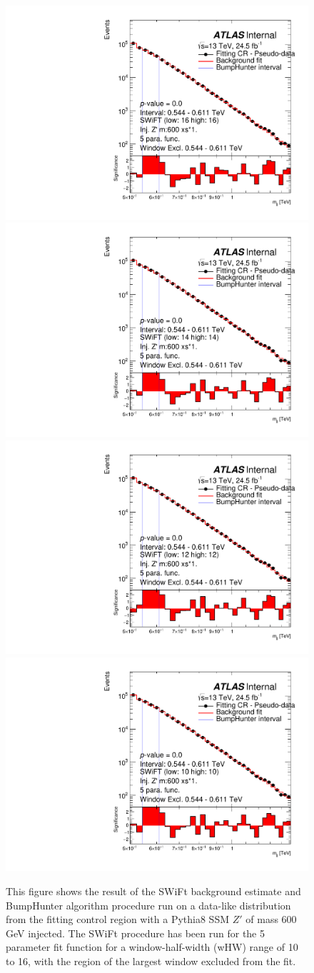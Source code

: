 \begin{figure}[!htb]
\captionsetup[subfigure]{aboveskip=0pt,justification=centering}
\centering
{} {
  \includegraphics[width=0.3\linewidth, angle=0]{figs/Dibjet/LowMass/FitStudy/bhFit_corrFitCR_dataLike_v13_5para_low16_high16_inj_Zprimebb600_xsFactor1_removedWindow.pdf}
}
 {
  \includegraphics[width=0.3\linewidth, angle=0]{figs/Dibjet/LowMass/FitStudy/bhFit_corrFitCR_dataLike_v13_5para_low14_high14_inj_Zprimebb600_xsFactor1_removedWindow.pdf}
}\\
 {
  \includegraphics[width=0.3\linewidth, angle=0]{figs/Dibjet/LowMass/FitStudy/bhFit_corrFitCR_dataLike_v13_5para_low12_high12_inj_Zprimebb600_xsFactor1_removedWindow.pdf}
}
 {
  \includegraphics[width=0.3\linewidth, angle=0]{figs/Dibjet/LowMass/FitStudy/bhFit_corrFitCR_dataLike_v13_5para_low10_high10_inj_Zprimebb600_xsFactor1_removedWindow.pdf}
}
\vspace{10pt}
\caption{\label{fig:bhFit_lm_corrFitCR_dataLike_inj_Zprimebb600_xsFactor1_removedWindow}
  This figure shows the result of the SWiFt background estimate and {\sc BumpHunter} algorithm procedure run on a data-like distribution
  from the fitting control region with a Pythia8 SSM $Z'$ of mass 600 GeV injected.
  The SWiFt procedure has been run for the 5 parameter fit function for a window-half-width (wHW) range of 10 to 16, with the region of the largest window excluded from the fit.
}
\end{figure}


